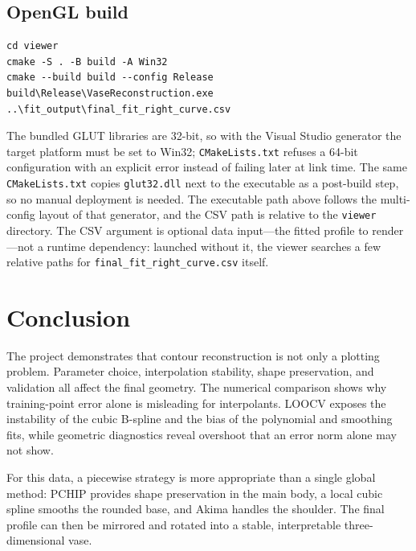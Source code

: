 \documentclass[a4paper,11pt]{article}
\begin{document}
\subsection{OpenGL build}
\begin{lstlisting}
cd viewer
cmake -S . -B build -A Win32
cmake --build build --config Release
build\Release\VaseReconstruction.exe ..\fit_output\final_fit_right_curve.csv
\end{lstlisting}
The bundled GLUT libraries are 32-bit, so with the Visual Studio generator the
target platform must be set to Win32; \texttt{CMakeLists.txt} refuses a 64-bit
configuration with an explicit error instead of failing later at link time.
The same \texttt{CMakeLists.txt} copies \texttt{glut32.dll} next to the
executable as a post-build step, so no manual deployment is needed.  The
executable path above follows the multi-config layout of that generator, and
the CSV path is relative to the \texttt{viewer} directory.  The CSV argument is
optional data input---the fitted profile to render---not a runtime dependency:
launched without it, the viewer searches a few relative paths for
\texttt{final\_fit\_right\_curve.csv} itself.

\section{Conclusion}

The project demonstrates that contour reconstruction is not only a plotting
problem.  Parameter choice, interpolation stability, shape preservation, and
validation all affect the final geometry.  The numerical comparison shows why
training-point error alone is misleading for interpolants.  LOOCV exposes the
instability of the cubic B-spline and the bias of the polynomial and smoothing
fits, while geometric diagnostics reveal overshoot that an error norm alone may
not show.

For this data, a piecewise strategy is more appropriate than a single global
method: PCHIP provides shape preservation in the main body, a local cubic spline
smooths the rounded base, and Akima handles the shoulder.  The final profile can
then be mirrored and rotated into a stable, interpretable three-dimensional
vase.
\end{document}
